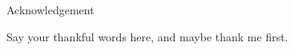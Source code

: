 \vspace{5cm}

{\huge \centerline {Acknowledgement}}
\vspace{1cm}

Say your thankful words here, and maybe thank me first.